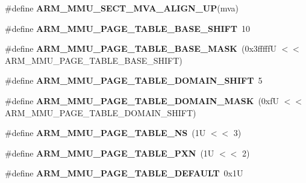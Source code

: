 \begin{DoxyCompactItemize}
\#define {\bfseries A\+R\+M\+\_\+\+M\+M\+U\+\_\+\+S\+E\+C\+T\+\_\+\+M\+V\+A\+\_\+\+A\+L\+I\+G\+N\+\_\+\+UP}(mva)
\item 
\mbox{\label{group__RTEMSScoreCPUARMCP15_gaff0c7798818549a10050ea43166d4798}} 
\#define {\bfseries A\+R\+M\+\_\+\+M\+M\+U\+\_\+\+P\+A\+G\+E\+\_\+\+T\+A\+B\+L\+E\+\_\+\+B\+A\+S\+E\+\_\+\+S\+H\+I\+FT}~10
\item 
\mbox{\label{group__RTEMSScoreCPUARMCP15_ga9d9cc9f4ca956e2a91287c729beb4953}} 
\#define {\bfseries A\+R\+M\+\_\+\+M\+M\+U\+\_\+\+P\+A\+G\+E\+\_\+\+T\+A\+B\+L\+E\+\_\+\+B\+A\+S\+E\+\_\+\+M\+A\+SK}~(0x3fffff\+U $<$$<$ A\+R\+M\+\_\+\+M\+M\+U\+\_\+\+P\+A\+G\+E\+\_\+\+T\+A\+B\+L\+E\+\_\+\+B\+A\+S\+E\+\_\+\+S\+H\+I\+F\+T)
\item 
\mbox{\label{group__RTEMSScoreCPUARMCP15_ga65eb3107099984690c485015d600ff6a}} 
\#define {\bfseries A\+R\+M\+\_\+\+M\+M\+U\+\_\+\+P\+A\+G\+E\+\_\+\+T\+A\+B\+L\+E\+\_\+\+D\+O\+M\+A\+I\+N\+\_\+\+S\+H\+I\+FT}~5
\item 
\mbox{\label{group__RTEMSScoreCPUARMCP15_ga9fa48bc91d132da83e66a67d4c862aca}} 
\#define {\bfseries A\+R\+M\+\_\+\+M\+M\+U\+\_\+\+P\+A\+G\+E\+\_\+\+T\+A\+B\+L\+E\+\_\+\+D\+O\+M\+A\+I\+N\+\_\+\+M\+A\+SK}~(0xf\+U $<$$<$ A\+R\+M\+\_\+\+M\+M\+U\+\_\+\+P\+A\+G\+E\+\_\+\+T\+A\+B\+L\+E\+\_\+\+D\+O\+M\+A\+I\+N\+\_\+\+S\+H\+I\+F\+T)
\item 
\mbox{\label{group__RTEMSScoreCPUARMCP15_gaa4cac111ef6f8120a32c86e928772334}} 
\#define {\bfseries A\+R\+M\+\_\+\+M\+M\+U\+\_\+\+P\+A\+G\+E\+\_\+\+T\+A\+B\+L\+E\+\_\+\+NS}~(1\+U $<$$<$ 3)
\item 
\mbox{\label{group__RTEMSScoreCPUARMCP15_ga57005fc7ad32cec22c9d960be4b878a4}} 
\#define {\bfseries A\+R\+M\+\_\+\+M\+M\+U\+\_\+\+P\+A\+G\+E\+\_\+\+T\+A\+B\+L\+E\+\_\+\+P\+XN}~(1\+U $<$$<$ 2)
\item 
\mbox{\label{group__RTEMSScoreCPUARMCP15_ga21203819412123842b1c99eb87bff04f}} 
\#define {\bfseries A\+R\+M\+\_\+\+M\+M\+U\+\_\+\+P\+A\+G\+E\+\_\+\+T\+A\+B\+L\+E\+\_\+\+D\+E\+F\+A\+U\+LT}~0x1U
\item 

\end{DoxyCompactItemize}
